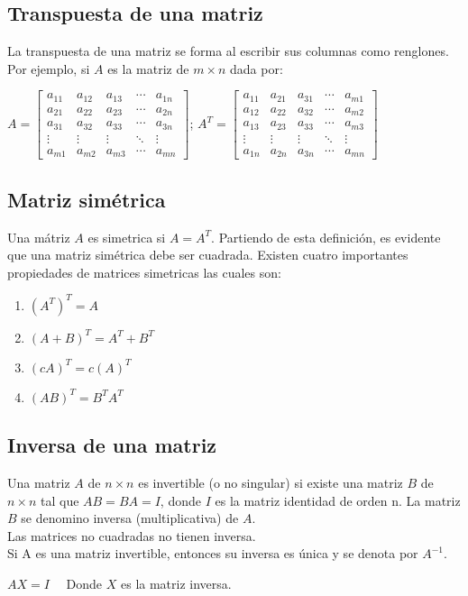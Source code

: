 \subsection{Transpuesta de una matriz}
La transpuesta de una matriz se forma al escribir sus columnas como renglones. Por ejemplo, si $A$ es la matriz de $m \times n$ dada por:
\begin{center}
$A=\begin{bmatrix}a_{11} & a_{12} & a_{13} & \cdots &a_{1n} \\ a_{21} & a_{22} & a_{23} & \cdots & a_{2n}\\ a_{31} & a_{32} & a_{33} & \cdots & a_{3n} \\
\vdots & \vdots & \vdots & \ddots & \vdots\\
a_{m1} & a_{m2} & a_{m3} & \cdots & a_{mn}
\end{bmatrix}$; \bigskip 
 $A^T=\begin{bmatrix}a_{11} & a_{21} & a_{31} & \cdots &a_{m1} \\ a_{12} & a_{22} & a_{32} & \cdots & a_{m2}\\ a_{13} & a_{23} & a_{33} & \cdots & a_{m3} \\
\vdots & \vdots & \vdots & \ddots & \vdots\\
a_{1n} & a_{2n} & a_{3n} & \cdots & a_{mn}
\end{bmatrix}$
\end{center}
\subsection{Matriz sim\'etrica}
Una m\'atriz $A$ es simetrica si $A=A^T$. Partiendo de esta definici\'on, es evidente que una matriz sim\'etrica debe ser cuadrada. Existen cuatro importantes propiedades de matrices simetricas las cuales son:
\begin{enumerate}
\item $(A^T)^T=A$
\item $(A+B)^T=A^T+B^T$
\item $(cA)^T=c(A)^T$
\item $(AB)^T=B^TA^T$
\end{enumerate}
\subsection{Inversa de una matriz}
Una matriz $A$ de $n \times n$ es invertible (o no singular) si existe una matriz $B$ de $n \times n$ tal que $AB=BA=I$, donde $I$ es la matriz identidad de orden n. La matriz $B$ se denomino inversa (multiplicativa) de $A$.\\
Las matrices no cuadradas no tienen inversa.\\
Si A es una matriz invertible, entonces su inversa es \'unica y se denota por $A^{-1}$.
\begin{center}
$AX=I \quad$ Donde $X$ es la matriz inversa.
\end{center}
